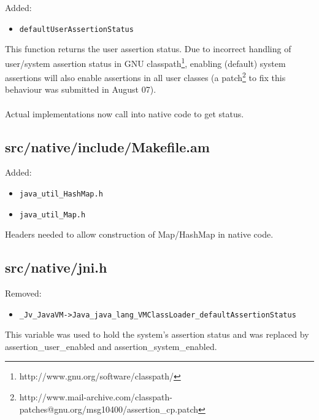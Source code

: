 \documentclass{article}%
\begin{document}
Added:
\begin{itemize}
\item{\verb'defaultUserAssertionStatus'}
\end{itemize}

\noindent This function returns the user assertion status. Due to incorrect handling of user/system assertion status in GNU classpath\footnote{http://www.gnu.org/software/classpath/}, enabling (default) system assertions will also enable assertions in all user classes (a patch\footnote{http://www.mail-archive.com/classpath-patches@gnu.org/msg10400/assertion\_cp.patch} to fix this behaviour was submitted in August 07).
\\\\
Actual implementations now call into native code to get status.

\subsection{src/native/include/Makefile.am}
Added:
\begin{itemize}
\item{\verb'java_util_HashMap.h'}
\item{\verb'java_util_Map.h'}
\end{itemize}
\noindent Headers needed to allow construction of Map/HashMap in native code.

\subsection{src/native/jni.h}
Removed:
\begin{itemize}
\item{\verb'_Jv_JavaVM->Java_java_lang_VMClassLoader_defaultAssertionStatus'}
\end{itemize}
\noindent This variable was used to hold the system's assertion status and was replaced by assertion\_user\_enabled and assertion\_system\_enabled.
\end{document}
